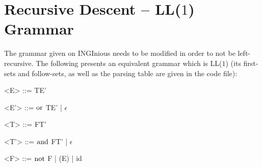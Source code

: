 \section{Recursive Descent -- LL(\(1\)) Grammar}
The grammar given on INGInious needs to be modified in order to not be left-recursive.
The following presents an equivalent grammar which is LL(\(1\)) (its first-sets and follow-sets, as well as the parsing table are given in the code file):
\begin{grammar}
	<E> ::= TE'
	
	<E'> ::= \(\mathbin{\mathrm{or}}\) TE' | \(\epsilon\)
	
	<T> ::= FT'
	
	<T'> ::= \(\mathbin{\mathrm{and}}\) FT' | \(\epsilon\)
	
	<F> ::= \(\mathop{\mathrm{not}}\) F | (E) | id
\end{grammar}